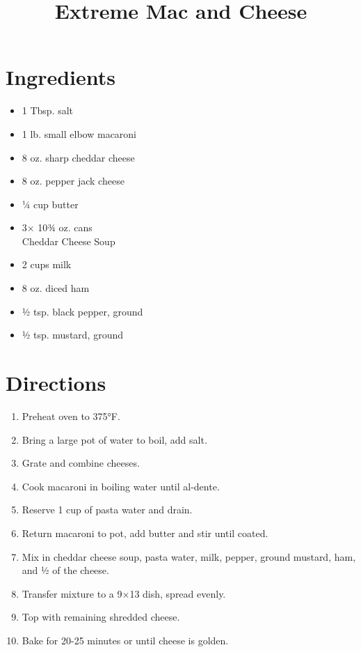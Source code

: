 \documentclass[11pt,letterpaper]{article}
\title{Extreme Mac and Cheese}
\author{ }
\date{}
\begin{document}
\maketitle

\section*{Ingredients}
\begin{multicols}{2}
    \begin{itemize}
	\item 1 Tbsp. salt
	\item 1 lb. small elbow macaroni
        \item 8 oz. sharp cheddar cheese
        \item 8 oz. pepper jack cheese
        \item ¼ cup butter
    \end{itemize}
    \columnbreak
    \begin{itemize}
        \item 3× 10¾ oz. cans \\ Cheddar Cheese Soup
        \item 2 cups milk
        \item 8 oz. diced ham
        \item ½ tsp. black pepper, ground 
        \item ½ tsp. mustard, ground 
    \end{itemize}
\end{multicols}

\section*{Directions}
\begin{enumerate}
    \item Preheat oven to 375°F.
    \item Bring a large pot of water to boil, add salt.
    \item Grate and combine cheeses.
    \item Cook macaroni in boiling water until al-dente.
    \item Reserve 1 cup of pasta water and drain.
    \item Return macaroni to pot, add butter and stir until coated.
    \item Mix in cheddar cheese soup, pasta water, milk, pepper, ground mustard, ham, and ½ of the cheese.
    \item Transfer mixture to a 9×13 dish, spread evenly.
    \item Top with remaining shredded cheese.
    \item Bake for 20-25 minutes or until cheese is golden.
\end{enumerate}
\end{document}
